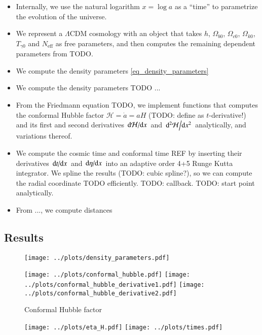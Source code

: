 \documentclass{aa}
\begin{document}
\begin{itemize}
	\item Internally, we use the natural logarithm $x = \log a$ as a ``time'' to parametrize the evolution of the universe.
	\item We represent a $\Lambda$CDM cosmology with an object that takes $h$, $\Omega_{b0}$, $\Omega_{c0}$, $\Omega_{k0}$, $T_{\gamma0}$ and $N_\text{eff}$ as free parameters, and then computes the remaining dependent parameters from TODO.
	\item We compute the density parameters \eqref{eq_density_parameters} 
	\item We compute the density parameters TODO ...
	\item From the Friedmann equation TODO, we implement functions that computes the conformal Hubble factor $\mathcal{H} = \dot{a} = aH$ (TODO: define as $t$-derivative!) and its first and second derivatives $\odv{\mathcal{H}}/{x}$ and $\odv[2]{\mathcal{H}}/{x}$ analytically, and variations thereof.
	\item We compute the cosmic time and conformal time REF by inserting their derivatives $\odv{t}/{x}$ and $\odv{\eta}/{x}$ into an adaptive order 4+5 Runge Kutta integrator. We spline the results (TODO: cubic spline?), so we can compute the radial coordinate TODO efficiently. TODO: callback. TODO: start point analytically.
	\item From ..., we compute distances
\end{itemize}

\subsection{Results}

\begin{figure}
	\centering
	\texttt{[image: ../plots/density\_parameters.pdf]}
\end{figure}

\begin{figure}
	\centering
	\texttt{[image: ../plots/conformal\_hubble.pdf]}
	\texttt{[image: ../plots/conformal\_hubble\_derivative1.pdf]}
	\texttt{[image: ../plots/conformal\_hubble\_derivative2.pdf]}
	\caption{Conformal Hubble factor}
	\label{fig_conformal_hubble}
\end{figure}

\begin{figure}
	\centering
	\texttt{[image: ../plots/eta\_H.pdf]}
	\texttt{[image: ../plots/times.pdf]}
\end{figure}
\end{document}

